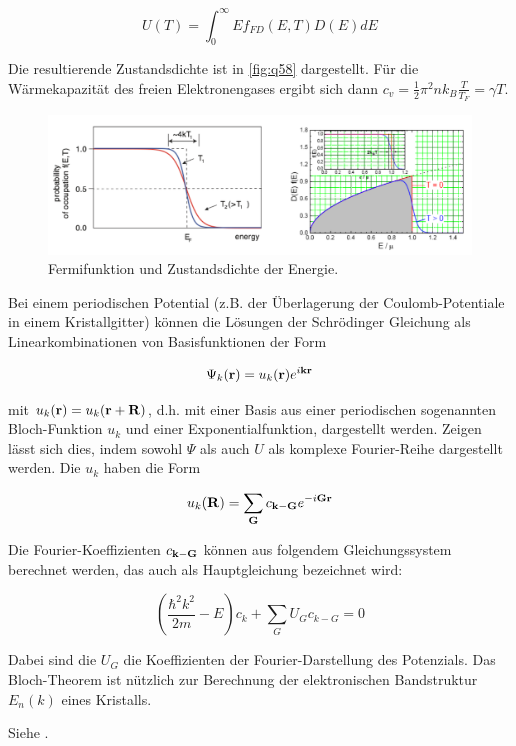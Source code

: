 \[ U(T) = \displaystyle \int_0^\infty E f_{FD}(E,T) D(E) dE \]

Die resultierende Zustandsdichte ist in \autoref{fig:q58} dargestellt. Für die Wärmekapazität des freien Elektronengases ergibt sich dann \( c_v = \frac{1}{2} \pi^2 nk_B \frac{T}{T_F} = \gamma T\). 

\begin{figure}[H]
    \centering
    \includegraphics[width=\textwidth]{resources/24-03-2015/D(E)f(E).png}
    \caption{Fermifunktion und Zustandsdichte der Energie.}
    \label{fig:q58}
\end{figure}

\label{q:59}

Bei einem periodischen Potential (z.B. der Überlagerung der Coulomb-Potentiale in einem Kristallgitter) können die Lösungen der Schrödinger Gleichung als Linearkombinationen von Basisfunktionen der Form

\[ \Psi_k(\vb{r}) = u_k(\vb{r}) e^{i\vb{k}\vb{r}}\]

mit \( u_k(\vb{r}) = u_k(\vb{r} + \vb{R}) \), d.h. mit einer Basis aus einer periodischen sogenannten Bloch-Funktion $u_k$ und einer Exponentialfunktion, dargestellt werden. Zeigen lässt sich dies, indem sowohl $\Psi$ als auch $U$ als komplexe Fourier-Reihe dargestellt werden. Die $u_k$ haben die Form

\[ u_k(\vb{R}) = \displaystyle \sum_{\vb{G}} c_{\vb{k}-\vb{G}}  e^{-i \vb{G} \vb{r}} \]

Die Fourier-Koeffizienten $c_{\vb{k}-\vb{G}}$ können aus folgendem Gleichungssystem berechnet werden, das auch als Hauptgleichung bezeichnet wird:

\[ \left( \frac{\hbar^2 k^2}{2m} - E \right) c_k + \displaystyle \sum_G U_G c_{k-G} = 0 \]

Dabei sind die $U_G$ die Koeffizienten der Fourier-Darstellung des Potenzials. Das Bloch-Theorem ist nützlich zur Berechnung der elektronischen Bandstruktur $E_n(k)$ eines Kristalls. 

\label{q:60}

Siehe .

\newpage